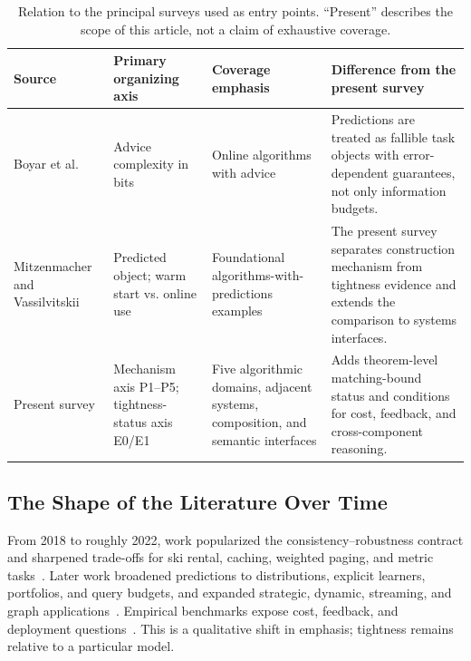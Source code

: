\documentclass[acmsmall,screen,nonacm]{acmart}
\theoremstyle{acmdefinition}%
\begin{document}
\begin{table}[t!]
\centering
\setlength{\tabcolsep}{3pt}
\caption{Relation to the principal surveys used as entry points. ``Present'' describes the scope of this article, not a claim of exhaustive coverage.}
\label{tab:prior_surveys}
\footnotesize
\begin{tabular}{@{}>{\raggedright\arraybackslash}p{2.55cm}>{\raggedright\arraybackslash}p{2.45cm}>{\raggedright\arraybackslash}p{3.37cm}>{\raggedright\arraybackslash}p{4.65cm}@{}}
\toprule
\textbf{Source} & \textbf{Primary organizing axis} & \textbf{Coverage emphasis} & \textbf{Difference from the present survey} \\
\midrule
Boyar et al.~\cite{boyar2017advice} & Advice complexity in bits & Online algorithms with advice & Predictions are treated as fallible task objects with error-dependent guarantees, not only information budgets. \\
Mitzenmacher and Vassilvitskii~\cite{mitzenmacher2021algorithms,mitzenmacher2022survey} & Predicted object; warm start vs. online use & Foundational algorithms-with-predictions examples & The present survey separates construction mechanism from tightness evidence and extends the comparison to systems interfaces. \\
Present survey & Mechanism axis P1--P5; tightness-status axis E0/E1 & Five algorithmic domains, adjacent systems, composition, and semantic interfaces & Adds theorem-level matching-bound status and conditions for cost, feedback, and cross-component reasoning. \\
\bottomrule
\end{tabular}
\end{table}

\subsection{The Shape of the Literature Over Time}
\label{subsec:timeline}

From 2018 to roughly 2022, work popularized the consistency--robustness contract and sharpened trade-offs for ski rental, caching, weighted paging, and metric tasks~\cite{purohit2018improving,lykouris2018competitive,wei2020optimal,rohatgi2020near,antoniadis2020metric,bansal2022weighted}. Later work broadened predictions to distributions, explicit learners, portfolios, and query budgets, and expanded strategic, dynamic, streaming, and graph applications~\cite{dinitz2024binarysearch,elias2024explicit,dinitz2022portfolios,im2022parsimonious,balkanski2024randomized,dong2025correlation,polak2026apsp}. Empirical benchmarks expose cost, feedback, and deployment questions~\cite{chledowski2021robust,wongkham2022updatable,wang2021cardinality}. This is a qualitative shift in emphasis; tightness remains relative to a particular model.
\end{document}
